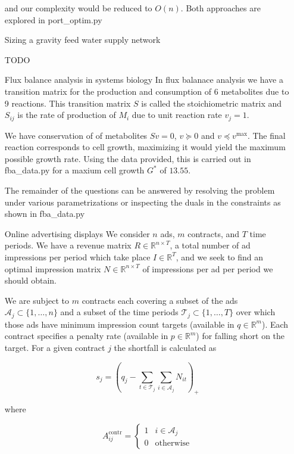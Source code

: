 \documentclass[12pt]{article}
\begin{document}
\begin{itemize}
    and our complexity would be reduced to $O(n)$. Both approaches are explored in port_optim.py
    
\item[Sizing a gravity feed water supply network]

  TODO

\item[Flux balance analysis in systems biology]
  In flux balanace analysis we have a transition matrix for the production and consumption of 6 metabolites due to 9 reactions. This transition matrix $S$ is called the stoichiometric matrix and $S_{ij}$ is the rate of production of $M_i$ due to unit reaction rate $v_j = 1$.

  We have conservation of of metabolites $Sv = 0$, $v \succeq 0$ and $v \preceq v^\text{max}$. The final reaction corresponds to cell growth, maximizing it would yield the maximum possible growth rate. Using the data provided, this is carried out in fba_data.py for a maxium cell growth $G^*$ of $13.55$.

  The remainder of the questions can be answered by resolving the problem under various parametrizations or inspecting the duals in the constraints as shown in fba_data.py


\item[Online advertising displays]
  We consider $n$ ads, $m$ contracts, and $T$ time periods. We have a revenue matrix $R \in \mathbb{R}^{n \times T}$, a total number of ad impressions per period which take place $I \in \mathbb{R}^T$, and we seek to find an optimal impression matrix $N \in \mathbb{R}^{n \times T}$ of impressions per ad per period we should obtain.

  We are subject to $m$ contracts each covering a subset of the ads $\mathcal{A}_j \subset \{1, \ldots, n\}$ and a subset of the time periods $\mathcal{T}_j \subset \{1,\ldots,T\}$ over which those ads have minimum impression count targets (available in $q \in \mathbb{R}^m$). Each contract specifies a penalty rate (available in $p \in \mathbb{R}^m$) for falling short on the target. For a given contract $j$ the shortfall is calculated as

  $$s_j = \left(q_j - \sum_{t \in \mathcal{T}_j} \sum _{i \in \mathcal{A}_j} N_{it} \right)_+$$

  where
  
  $$A_{ij}^\text{contr} = \begin{cases}
    1 & i \in \mathcal{A}_j \\
    0 & \text{otherwise}
  \end{cases}$$


\end{itemize}
\end{document}
